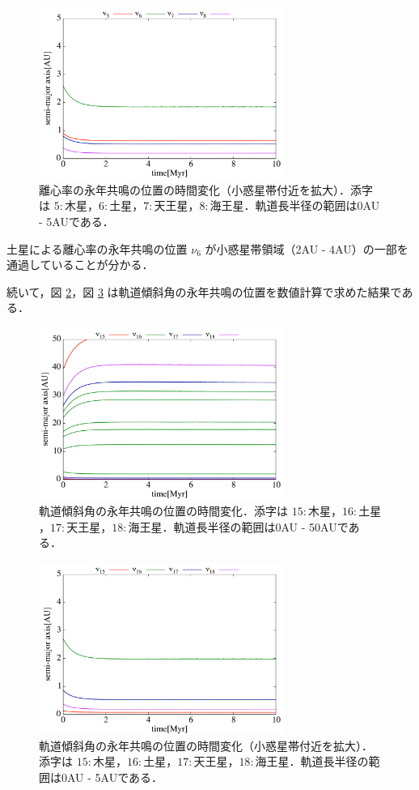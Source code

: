 \documentclass[11pt,a4paper,oneside,onecolumn]{jreport}
\begin{document}
\begin{figure}[H]
\centering
\includegraphics[width=8cm]{./image/SecularResonanceAxis_ecc_upto5AU.pdf}
\caption{離心率の永年共鳴の位置の時間変化（小惑星帯付近を拡大）．添字は $5 : 木星$，$6 : 土星$，$7 : 天王星$，$8 : 海王星$．軌道長半径の範囲は0AU - 5AUである．\label{fig:SecularResonanceAxis_ecc_upto5AU}}
\end{figure}

土星による離心率の永年共鳴の位置 $\nu_6$ が小惑星帯領域（2AU - 4AU）の一部を通過していることが分かる．

続いて，図 \ref{fig:SecularResonanceAxis_inc}，図 \ref{fig:SecularResonanceAxis_inc_upto5AU} は軌道傾斜角の永年共鳴の位置を数値計算で求めた結果である．

\begin{figure}[H]
\centering
\includegraphics[width=8cm]{./image/SecularResonanceAxis_inc.pdf}
\caption{軌道傾斜角の永年共鳴の位置の時間変化．添字は $15 : 木星$，$16 : 土星$，$17 : 天王星$，$18 : 海王星$．軌道長半径の範囲は0AU - 50AUである．\label{fig:SecularResonanceAxis_inc}}
\end{figure}

\begin{figure}[H]
\centering
\includegraphics[width=8cm]{./image/SecularResonanceAxis_inc_upto5AU.pdf}
\caption{軌道傾斜角の永年共鳴の位置の時間変化（小惑星帯付近を拡大）．添字は $15 : 木星$，$16 : 土星$，$17 : 天王星$，$18 : 海王星$．軌道長半径の範囲は0AU - 5AUである．\label{fig:SecularResonanceAxis_inc_upto5AU}}
\end{figure}
\end{document}
